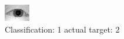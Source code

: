 \begin{figure}[h!]
\begin{center}
\includegraphics[width=0.60\columnwidth]{figures/ID887_class_1_target_2.png}
\end{center}
\caption{ Classification: 1 actual target: 2}
\label{fig:ID887_class_1_target_2}
\end{figure}
